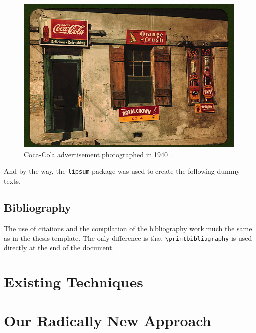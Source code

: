 \documentclass[english,twocolumn,smartquotes]{hgbarticle}
\begin{document}
\begin{figure}
	\centering
	\includegraphics[width=1.0\columnwidth]{cola-public-domain-photo-p}
	\caption{Coca-Cola advertisement photographed in 1940 \cite{CocaCola1940}.}
	\label{fig:CocaCola}
\end{figure}

And by the way, the \texttt{lipsum} package was used to create the following
dummy texts. 

\subsection{Bibliography}

The use of citations and the compilation of the bibliography work much the
same as in the thesis template. The only difference is that
\verb!\printbibliography! is used directly at the end of the document.


\section{Existing Techniques}

\lipsum[2-4]


\section{Our Radically New Approach}

\lipsum[5-7]
\end{document}

